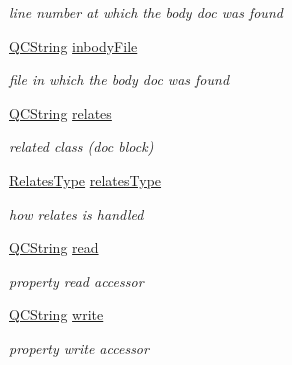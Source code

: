 \begin{DoxyCompactItemize}
\begin{DoxyCompactList}\small\item\em line number at which the body doc was found \end{DoxyCompactList}\item 
\mbox{\label{class_entry_aee8cba460792393b5051230c78fbb204}} 
\mbox{\hyperlink{class_q_c_string}{Q\+C\+String}} \mbox{\hyperlink{class_entry_aee8cba460792393b5051230c78fbb204}{inbody\+File}}
\begin{DoxyCompactList}\small\item\em file in which the body doc was found \end{DoxyCompactList}\item 
\mbox{\label{class_entry_a611ec017dea1768b7093bea6e4177cba}} 
\mbox{\hyperlink{class_q_c_string}{Q\+C\+String}} \mbox{\hyperlink{class_entry_a611ec017dea1768b7093bea6e4177cba}{relates}}
\begin{DoxyCompactList}\small\item\em related class (doc block) \end{DoxyCompactList}\item 
\mbox{\label{class_entry_a74ff1e30a3ed19f82ce61f70b8a5a413}} 
\mbox{\hyperlink{types_8h_aa370e9ca1d3ff266cab92689bcc37d9e}{Relates\+Type}} \mbox{\hyperlink{class_entry_a74ff1e30a3ed19f82ce61f70b8a5a413}{relates\+Type}}
\begin{DoxyCompactList}\small\item\em how relates is handled \end{DoxyCompactList}\item 
\mbox{\label{class_entry_ac5ad6c6585645a4427b54e5281316b65}} 
\mbox{\hyperlink{class_q_c_string}{Q\+C\+String}} \mbox{\hyperlink{class_entry_ac5ad6c6585645a4427b54e5281316b65}{read}}
\begin{DoxyCompactList}\small\item\em property read accessor \end{DoxyCompactList}\item 
\mbox{\label{class_entry_a76a68a1f14534f069444ba2704ef7404}} 
\mbox{\hyperlink{class_q_c_string}{Q\+C\+String}} \mbox{\hyperlink{class_entry_a76a68a1f14534f069444ba2704ef7404}{write}}
\begin{DoxyCompactList}\small\item\em property write accessor \end{DoxyCompactList}\item 

\end{DoxyCompactItemize}
